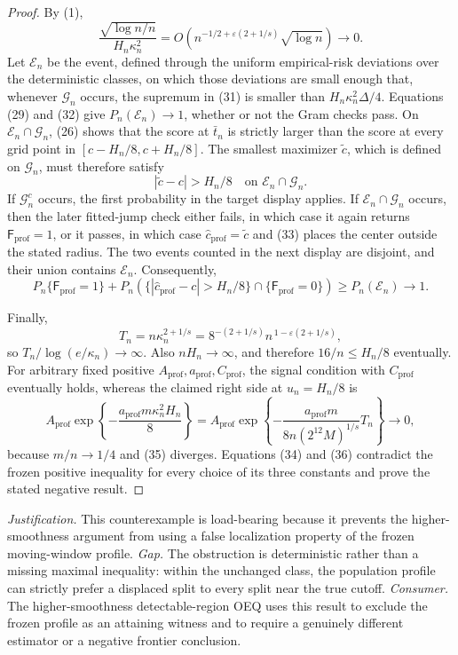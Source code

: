 \documentclass{article}
\begin{document}
\begin{proof}
By (1),
\[
 \frac{\sqrt{\log n/n}}{H_n\kappa_n^2}
 =O\!\left(n^{-1/2+\varepsilon(2+1/s)}\sqrt{\log n}\right)
 \longrightarrow0.
 \tag{32}
\]
Let \(\mathcal E_n\) be the event, defined through the uniform
empirical-risk deviations over the deterministic classes, on which
those deviations are small enough that, whenever \(\mathcal G_n\)
occurs, the supremum in (31) is smaller than
\(H_n\kappa_n^2\Delta/4\).  Equations (29) and (32) give
\(P_n(\mathcal E_n)\to1\), whether or not the Gram checks pass.  On
\(\mathcal E_n\cap\mathcal G_n\), (26) shows that the score at
\(\bar t_n\) is strictly larger than the score at every grid point in
\([c-H_n/8,c+H_n/8]\).  The smallest maximizer \(\widetilde c\), which
is defined on \(\mathcal G_n\), must therefore satisfy
\[
 |\widetilde c-c|>H_n/8
 \quad\text{on }\mathcal E_n\cap\mathcal G_n.
 \tag{33}
\]
If \(\mathcal G_n^c\) occurs, the first probability in the target
display applies.  If \(\mathcal E_n\cap\mathcal G_n\) occurs, then the
later fitted-jump check either fails, in which case it again returns
\(\mathsf F_{\mathrm{prof}}=1\), or it passes, in which case
\(\widehat c_{\mathrm{prof}}=\widetilde c\) and (33) places the center
outside the stated radius.  The two events counted in the next display
are disjoint, and their union contains \(\mathcal E_n\).  Consequently,
\[
 P_n\{\mathsf F_{\mathrm{prof}}=1\}
 +P_n\!\left(\{|\widehat c_{\mathrm{prof}}-c|>H_n/8\}
       \cap\{\mathsf F_{\mathrm{prof}}=0\}\right)
 \ge P_n(\mathcal E_n)\longrightarrow1.
 \tag{34}
\]

Finally,
\[
 T_n=n\kappa_n^{2+1/s}
 =8^{-(2+1/s)}n^{\,1-\varepsilon(2+1/s)},
 \tag{35}
\]
so \(T_n/\log(e/\kappa_n)\to\infty\).  Also
\(nH_n\to\infty\), and therefore \(16/n\le H_n/8\) eventually.  For
arbitrary fixed positive
\(A_{\mathrm{prof}},a_{\mathrm{prof}},C_{\mathrm{prof}}\), the signal
condition with \(C_{\mathrm{prof}}\) eventually holds, whereas the
claimed right side at \(u_n=H_n/8\) is
\[
 A_{\mathrm{prof}}
 \exp\left\{-\frac{a_{\mathrm{prof}}m\kappa_n^2H_n}{8}\right\}
 =A_{\mathrm{prof}}
 \exp\left\{-\frac{a_{\mathrm{prof}}m}{8n(2^{12}M)^{1/s}}T_n\right\}
 \longrightarrow0,
 \tag{36}
\]
because \(m/n\to1/4\) and (35) diverges.  Equations (34) and (36)
contradict the frozen positive inequality for every choice of its three
constants and prove the stated negative result.
\end{proof}
\par\smallskip\noindent \textit{Justification.} This counterexample is load-bearing because it prevents the higher-smoothness argument from using a false localization property of the frozen moving-window profile. \textit{Gap.} The obstruction is deterministic rather than a missing maximal inequality: within the unchanged class, the population profile can strictly prefer a displaced split to every split near the true cutoff. \textit{Consumer.} The higher-smoothness detectable-region OEQ uses this result to exclude the frozen profile as an attaining witness and to require a genuinely different estimator or a negative frontier conclusion.
\end{document}
